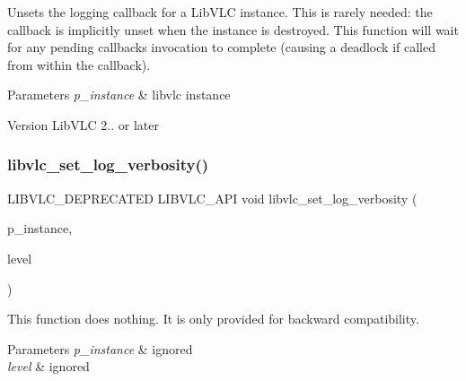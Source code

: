 Unsets the logging callback for a Lib\+V\+LC instance. This is rarely needed\+: the callback is implicitly unset when the instance is destroyed. This function will wait for any pending callbacks invocation to complete (causing a deadlock if called from within the callback).


\begin{DoxyParams}{Parameters}
{\em p\+\_\+instance} & libvlc instance \\
\hline
\end{DoxyParams}
\begin{DoxyVersion}{Version}
Lib\+V\+LC 2.. or later 
\end{DoxyVersion}
\mbox{\label{group__libvlc__log_ga263f3734e93f4a3a8fa9df3255168c08}} 
\subsubsection{\texorpdfstring{libvlc\+\_\+set\+\_\+log\+\_\+verbosity()}{libvlc\_set\_log\_verbosity()}}
{\footnotesize\ttfamily L\+I\+B\+V\+L\+C\+\_\+\+D\+E\+P\+R\+E\+C\+A\+T\+ED L\+I\+B\+V\+L\+C\+\_\+\+A\+PI void libvlc\+\_\+set\+\_\+log\+\_\+verbosity (\begin{DoxyParamCaption}\item[{\hyperlink{group__libvlc__core_ga316d739a80da4678206c79f4d6c2e284}{libvlc\+\_\+instance\+\_\+t} $\ast$}]{p\+\_\+instance,  }\item[{unsigned}]{level }\end{DoxyParamCaption})}

This function does nothing. It is only provided for backward compatibility.


\begin{DoxyParams}{Parameters}
{\em p\+\_\+instance} & ignored \\
\hline
{\em level} & ignored \\
\hline
\end{DoxyParams}
